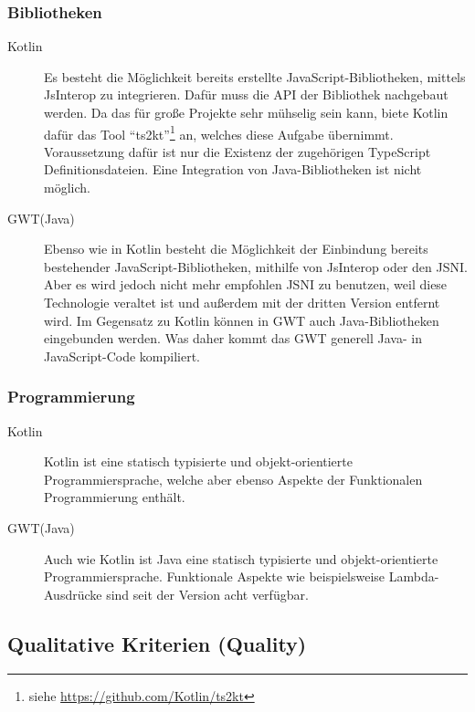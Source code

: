 \subsubsection{Bibliotheken}
\begin{description}
	\item[Kotlin] Es besteht die Möglichkeit bereits erstellte JavaScript-Bibliotheken, mittels \gls{JsInterop} zu integrieren. Dafür muss die \gls{API} der Bibliothek nachgebaut werden. Da das für große Projekte sehr mühselig sein kann, biete Kotlin dafür das Tool \enquote{ts2kt}\footnote{siehe \url{https://github.com/Kotlin/ts2kt}} an, welches diese Aufgabe übernimmt. Voraussetzung dafür ist nur die Existenz der zugehörigen TypeScript Definitionsdateien. Eine Integration von Java-Bibliotheken ist nicht möglich. \cite{kotlinJsInteop, kotlinJsJavaToJs}
	\item[GWT(Java)] Ebenso wie in Kotlin besteht die Möglichkeit der Einbindung bereits bestehender JavaScript-Bibliotheken, mithilfe von \gls{JsInterop} oder den \gls{JSNI}. Aber es wird jedoch nicht mehr empfohlen  \gls{JSNI} zu benutzen, weil diese Technologie veraltet ist und außerdem mit der dritten Version entfernt wird. Im Gegensatz zu Kotlin können in \gls{GWT} auch Java-Bibliotheken eingebunden werden. Was daher kommt das \gls{GWT} generell Java- in JavaScript-Code kompiliert. \cite{gwtJsInterop, gwtJSNI}
\end{description}

\subsubsection{Programmierung}
\begin{description}
	\item[Kotlin] Kotlin ist eine statisch typisierte und objekt-orientierte Programmiersprache, welche aber ebenso Aspekte der Funktionalen Programmierung enthält. \cite{kotlinInfo}
	\item[GWT(Java)] Auch wie Kotlin ist Java eine statisch typisierte und objekt-orientierte Programmiersprache. Funktionale Aspekte wie beispielsweise Lambda-Ausdrücke sind seit der Version acht verfügbar. \cite{java8Specification}
\end{description}

\subsection{Qualitative Kriterien (Quality)}

